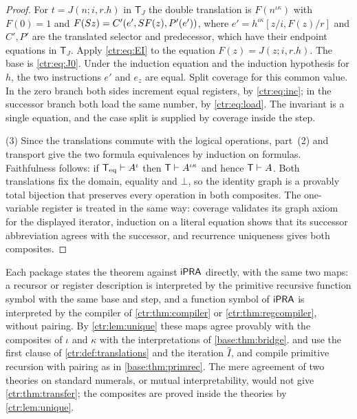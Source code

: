 \begin{proof}
For $t=J(n;i,r.h)$ in $\mathsf T_J$ the double translation is $F(n^{\iota\kappa})$ with
$F(0)=1$ and $F(S z)=C'(e',S F(z),P'(e'))$, where $e'=h^{\iota\kappa}[z/i,F(z)/r]$ and
$C',P'$ are the translated selector and predecessor, which have their endpoint equations in
$\mathsf T_J$. Apply \eqref{ctr:eq:EI} to the equation $F(z)=J(z;i,r.h)$. The base is
\eqref{ctr:eq:J0}. Under the induction equation and the induction hypothesis for $h$, the
two instructions $e'$ and $e_z$ are equal. Split coverage for this common value. In the zero
branch both sides increment equal registers, by \eqref{ctr:eq:inc}; in the successor branch
both load the same number, by \eqref{ctr:eq:load}. The invariant is a single equation, and
the case split is supplied by coverage inside the step.

(3) Since the translations commute with the logical operations, part~(2) and transport give
the two formula equivalences by induction on formulas. Faithfulness follows: if
$\mathsf{T}_{\mathrm{eq}}\vdash A^\iota$ then $\mathsf T\vdash A^{\iota\kappa}$ and hence $\mathsf T\vdash A$.
Both translations fix the domain, equality and $\bot$, so the identity graph is a provably
total bijection that preserves every operation in both composites. The one-variable register
is treated in the same way: coverage validates its graph axiom for the displayed iterator,
induction on a literal equation shows that its successor abbreviation agrees with the
successor, and recurrence uniqueness gives both composites.
\end{proof}

\begin{remark}\label{ctr:rem:direct}
Each package states the theorem against $\mathsf{iPRA}$ directly, with the same two maps: a recursor
or register description is interpreted by the primitive recursive function symbol with the
same base and step, and a function symbol of $\mathsf{iPRA}$ is interpreted by the compiler of
\cref{ctr:thm:compiler} or \cref{ctr:thm:regcompiler}, without pairing. By
\cref{ctr:lem:unique} these maps agree provably with the composites of $\iota$ and $\kappa$
with the interpretations of \cref{base:thm:bridge}.  and
 use the first clause of \cref{ctr:def:translations} and the
iteration $\widehat I$, and compile primitive recursion with pairing as in
\cref{base:thm:primrec}. The mere agreement of two theories on standard numerals, or mutual
interpretability, would not give \cref{ctr:thm:transfer}; the composites are proved inside
the theories by \cref{ctr:lem:unique}.
\end{remark}


